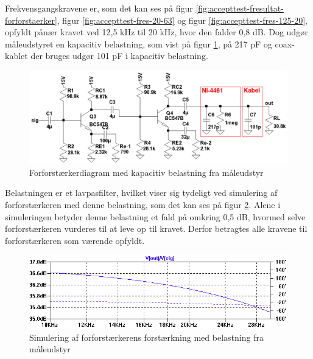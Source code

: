 Frekvensgangskravene er, som det kan ses på figur \ref{fig:accepttest-fresultat-forforstaerker}, figur \ref{fig:accepttest-fres-20-63} og figur \ref{fig:accepttest-fres-125-20}, opfyldt pånær kravet ved 12,5 kHz til 20 kHz, hvor den falder 0,8 dB. Dog udgør måleudstyret en kapacitiv belastning, som vist på figur \ref{fig:cap-error-diagram}, på 217 pF og coax-kablet der bruges udgør 101 pF i kapacitiv belastning. 

\begin{figure}[h]
\centering
\includegraphics[scale=0.35]{teknisk/forforstaerker/cap-error-diagram.png}
\caption{Forforstærkerdiagram med kapacitiv belastning fra måleudstyr}
\label{fig:cap-error-diagram}
\end{figure}

Belastningen er et lavpasfilter, hvilket viser sig tydeligt ved simulering af forforstærkeren med denne belastning, som det kan ses på figur \ref{fig:cap-error}. Alene i simuleringen betyder denne belastning et fald på omkring 0,5 dB, hvormed selve forforstærkeren vurderes til at leve op til kravet. Derfor betragtes alle kravene til forforstærkeren som værende opfyldt.

\begin{figure}[h]
\centering
\includegraphics[width=\textwidth]{teknisk/forforstaerker/cap-error.png}
\caption{Simulering af forforstærkerens forstærkning med belastning fra måleudstyr}
\label{fig:cap-error}
\end{figure}